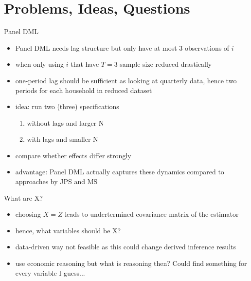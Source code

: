 \documentclass[a4paper, 12pt]{beamer}
\begin{document}
\section{Problems, Ideas, Questions}
\begin{frame}{Panel DML}
  \begin{itemize}
    \item Panel DML needs lag structure but only have at most 3 observations of $i$
    \item when only using $i$ that have $T=3$ sample size reduced drastically 
    \item one-period lag should be sufficient as looking at quarterly data, hence two periods for each household in reduced dataset
    \item idea: run two (three) specifications
    \begin{enumerate}
      \item without lags and larger N
      \item with lags and smaller N 
    \end{enumerate}
    \item compare whether effects differ strongly 
    \item advantage: Panel DML actually captures these dynamics compared to approaches by JPS and MS
  \end{itemize}
\end{frame}

\begin{frame}{What are X?}
  \begin{itemize}
    \item choosing $X=Z$ leads to undertermined covariance matrix of the estimator 
    \item hence, what variables should be X? 
    \item data-driven way not feasible as this could change derived inference results 
    \item use economic reasoning but what is reasoning then? Could find something for every variable I guess... 
  \end{itemize}
\end{frame}
\end{document}
